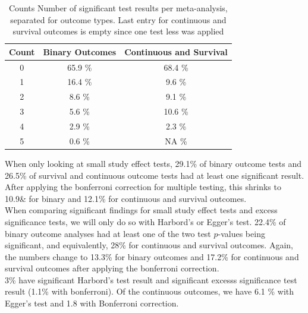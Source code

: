 \documentclass[11pt,a4paper,twoside]{book}\usepackage[]{graphicx}\usepackage[]{color}
\begin{document}
\begin{table}[ht]
\centering
\begingroup\footnotesize
\begin{tabular}{ccc}
  \hline
Count & Binary Outcomes & Continuous and Survival \\ 
  \hline
  0 & 65.9 \% & 68.4 \% \\ 
    1 & 16.4 \% & 9.6 \% \\ 
    2 & 8.6 \% & 9.1 \% \\ 
    3 & 5.6 \% & 10.6 \% \\ 
    4 & 2.9 \% & 2.3 \% \\ 
    5 & 0.6 \% & NA \% \\ 
   \hline
\end{tabular}
\endgroup
\caption{Counts Number of significant test results per meta-analysis, separated
       for outcome types. Last entry for continuous and survival outcomes is empty since one test less was 
       applied} 
\label{number.sig.tests}
\end{table}


When only looking at small study effect tests, 29.1\% of binary outcome tests and 26.5\% of survival and continuous outcome tests had at least one significant result. After applying the bonferroni correction for multiple testing, this shrinks to 10.9\& for binary and 12.1\% for continuous and survival outcomes. \\
When comparing significant findings for small study effect tests and excess significance tests, we will only do so with Harbord's or Egger's test. 22.4\% of binary outcome analyses had at least one of the two test $p$-values being significant, and equivalently, 28\% for continuous and survival outcomes. Again, the numbers change to 13.3\% for binary outcomes and 17.2\% for continuous and survival outcomes after applying the bonferroni correction. \\
3\% have significant Harbord's test result and significant excesss significance test result  (1.1\% with bonferroni). Of the continuous outcomes, we have 6.1 \% with Egger's test and 1.8 with Bonferroni correction. 

\end{document}
